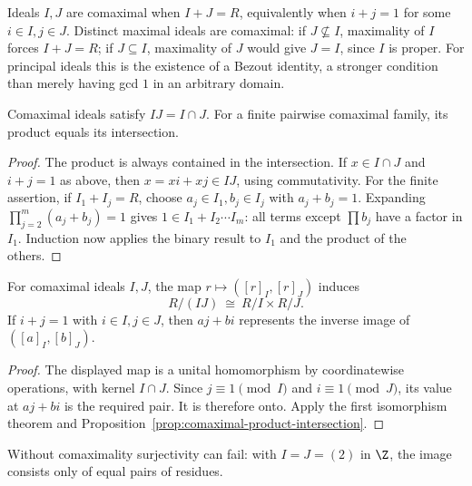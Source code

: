 Ideals $I,J$ are comaximal when $I+J=R$, equivalently when
$i+j=1$ for some $i\in I,j\in J$.
Distinct maximal ideals are comaximal: if $J\not\subseteq I$, maximality
of $I$ forces $I+J=R$; if $J\subseteq I$, maximality of $J$ would give
$J=I$, since $I$ is proper. For principal ideals this is the existence
of a Bezout identity, a stronger condition than merely having gcd $1$
in an arbitrary domain.

\begin{proposition}\label{prop:comaximal-product-intersection}
Comaximal ideals satisfy $IJ=I\cap J$. For a finite pairwise comaximal
family, its product equals its intersection.
\end{proposition}
\begin{proof}
The product is always contained in the intersection. If $x\in I\cap J$
and $i+j=1$ as above, then $x=xi+xj\in IJ$, using commutativity.
For the finite assertion, if $I_1+I_j=R$, choose
$a_j\in I_1,b_j\in I_j$ with $a_j+b_j=1$.
Expanding $\prod_{j=2}^m(a_j+b_j)=1$ gives
$1\in I_1+I_2\cdots I_m$: all terms except $\prod b_j$ have a factor
in $I_1$. Induction now applies the binary result to $I_1$ and the
product of the others.
\end{proof}

\begin{theorem}\label{thm:crt-binary}
For comaximal ideals $I,J$, the map
$r\mapsto([r]_I,[r]_J)$ induces
\[
 R/(IJ)\ \cong\ R/I\times R/J.
\]
If $i+j=1$ with $i\in I,j\in J$, then $aj+bi$ represents the inverse
image of $([a]_I,[b]_J)$.
\end{theorem}
\begin{proof}
The displayed map is a unital homomorphism by coordinatewise
operations, with kernel $I\cap J$. Since $j\equiv1\pmod I$ and
$i\equiv1\pmod J$, its value at $aj+bi$ is the required pair.
It is therefore onto. Apply the first isomorphism theorem and
Proposition~\ref{prop:comaximal-product-intersection}.
\end{proof}
Without comaximality surjectivity can fail: with $I=J=(2)$ in $\Z$,
the image consists only of equal pairs of residues.

